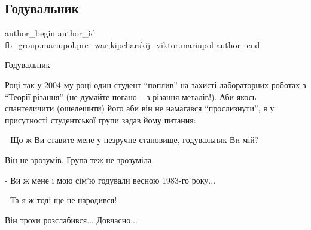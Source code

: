  
 
 
 
 

\subsection{Годувальник}
\label{sec:01_02_2023.fb.fb_group.mariupol.pre_war.1.goduvalnik}
 
\ifcmt
 author_begin
   author_id fb_group.mariupol.pre_war,kipcharskij_viktor.mariupol
 author_end
\fi

Годувальник

Році так у 2004-му році один студент \enquote{поплив} на захисті лабораторних роботах
з \enquote{Теорії різання} (не думайте погано – з різання металів!). Аби якось
спантеличити (ошелешити) його аби він не намагався \enquote{прослизнути}, я у
присутності студентської групи задав йому питання:

- Що ж Ви ставите мене у незручне становище, годувальник Ви мій?

Він не зрозумів. Група теж не зрозуміла. 

- Ви ж мене і мою сім'ю годували весною 1983-го року...

- Та я ж тоді ще не народився!

Він трохи розслабився... Довчасно...

